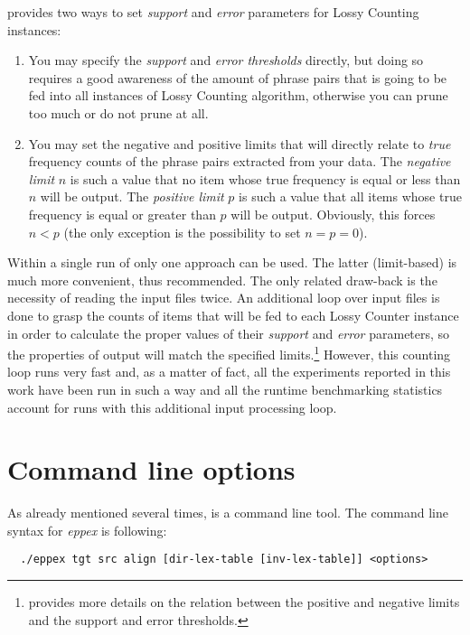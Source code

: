 \Eppex{} provides two ways to set \emph{support} and \emph{error} parameters
for Lossy Counting instances:
\begin{enumerate}
  \item You may specify the \emph{support} and \emph{error thresholds} directly, but doing so
    requires a good awareness of the amount of phrase pairs that is going to be fed into all
    instances of Lossy Counting algorithm, otherwise you can prune too much or do not prune at all.
  \item You may set the negative and positive limits that will directly relate to \emph{true}
    frequency counts of the phrase pairs extracted from your data. The \emph{negative limit}
    $n$ is such a value that no item whose true frequency is equal or less than $n$ will be output.
    The \emph{positive limit} $p$ is such a value that all items whose true frequency is equal
    or greater than $p$ will be output. Obviously, this forces $n < p$ (the only exception
    is the possibility to set $n = p = 0$).
\end{enumerate}

Within a single run of \eppex{} only one approach can be used.
The latter (limit-based) is much more convenient, thus recommended.
The only related draw-back is the necessity of reading the input files twice.
An additional loop over input files is done to grasp the counts of items
that will be fed to each Lossy Counter instance in order to calculate
the proper values of their \emph{support} and \emph{error} parameters,
so the properties of output will match the specified limits.\footnote{
provides more details on the relation between the positive and negative limits and
the support and error thresholds.}
However, this counting loop runs very fast and, as a matter of fact, all the \eppex{}
experiments reported in this work have been run in such a way and all the runtime
benchmarking statistics account for runs with this additional input processing loop.

\section{Command line options}

As already mentioned several times, \eppex{} is a command line tool.
The command line syntax for \emph{eppex} is following:

\begin{verbatim}
  ./eppex tgt src align [dir-lex-table [inv-lex-table]] <options>
\end{verbatim}

